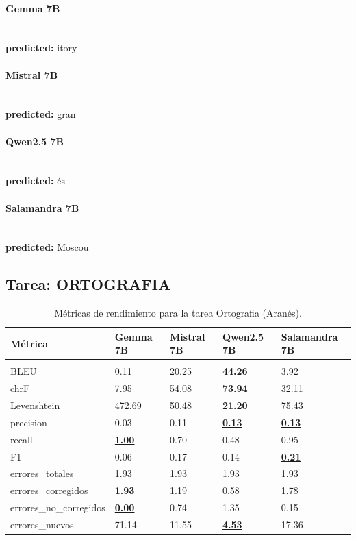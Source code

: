 \paragraph{Gemma 7B}~\\
\textbf{predicted:} itory

\paragraph{Mistral 7B}~\\
\textbf{predicted:} gran

\paragraph{Qwen2.5 7B}~\\
\textbf{predicted:} és

\paragraph{Salamandra 7B}~\\
\textbf{predicted:} Moscou

\subsection{Tarea: ORTOGRAFIA}\label{tarea-ortografia}
\begin{longtable}[]{@{}lllll@{}}
\toprule\noalign{}
Métrica & Gemma 7B & Mistral 7B & Qwen2.5 7B & Salamandra 7B \\
\midrule\noalign{}
\endhead
\bottomrule\noalign{}
\caption{Métricas de rendimiento para la tarea Ortografia (Aranés).}
\label{tab:metricas_ortografia_Aranés}\\
\endlastfoot
BLEU & 0.11 & 20.25 & \textbf{\underline{44.26}} & 3.92 \\
chrF & 7.95 & 54.08 & \textbf{\underline{73.94}} & 32.11 \\
Levenshtein & 472.69 & 50.48 & \textbf{\underline{21.20}} & 75.43 \\
precision & 0.03 & 0.11 & \textbf{\underline{0.13}} & \textbf{\underline{0.13}} \\
recall & \textbf{\underline{1.00}} & 0.70 & 0.48 & 0.95 \\
F1 & 0.06 & 0.17 & 0.14 & \textbf{\underline{0.21}} \\
errores\_totales & 1.93 & 1.93 & 1.93 & 1.93 \\
errores\_corregidos & \textbf{\underline{1.93}} & 1.19 & 0.58 & 1.78 \\
errores\_no\_corregidos & \textbf{\underline{0.00}} & 0.74 & 1.35 & 0.15 \\
errores\_nuevos & 71.14 & 11.55 & \textbf{\underline{4.53}} & 17.36 \\
\end{longtable}

